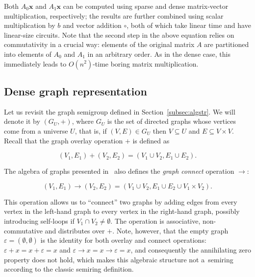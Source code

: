 \documentclass[11pt,letterpaper]{article}
\begin{document}
\noindent
Both $A_0 \mathbf{x}$ and $A_1 \mathbf{x}$ can be computed using sparse and
dense matrix-vector multiplication, respectively; the results are further
combined using scalar multiplication by $b$ and vector addition $\circ$, both of
which take linear time and have linear-size circuits. Note that the second step
in the above equation relies on commutativity in a crucial way: elements of the
original matrix $A$ are partitioned into elements of $A_0$ and $A_1$ in an
arbitrary order. As in the dense case, this immediately leads to $O(n^2)$-time
boring matrix multiplication.

\subsection{Dense graph representation}\label{sec-dense-graph}

Let us revisit the graph semigroup defined in Section~\ref{subsec:algstr}.
We will denote it by $(G_U, +)$, where $G_U$ is the set of directed graphs whose
vertices come from a universe $U$, that is, if $(V, E) \in G_U$ then
$V \subseteq U$ and $E \subseteq V \times V$. Recall that the graph overlay
operation $+$ is defined as

\[
(V_1, E_1) + (V_2, E_2) = (V_1 \cup V_2, E_1 \cup E_2).
\]

\noindent
The algebra of graphs presented in~\cite{mokhov2017algebraic} also defines
the \emph{graph connect} operation $\rightarrow$:

\[
(V_1, E_1) \rightarrow (V_2, E_2) = (V_1 \cup V_2, E_1 \cup E_2 \cup V_1 \times V_2).
\]

This operation allows us to ``connect'' two graphs by adding edges from every
vertex in the left-hand graph to every vertex in the right-hand graph, possibly
introducing self-loops if $V_1 \cap V_2 \neq \emptyset$. The operation is
associative, non-commutative and distributes over $+$. Note, however, that the
empty graph $\varepsilon = (\emptyset, \emptyset)$ is the identity for both
overlay and connect operations: $\varepsilon + x = x + \varepsilon = x$ and
$\varepsilon \rightarrow x = x \rightarrow \varepsilon = x$, and consequently
the annihilating zero property does not hold, which makes this algebraic
structure not a~semiring according to the classic semiring definition.
\end{document}
